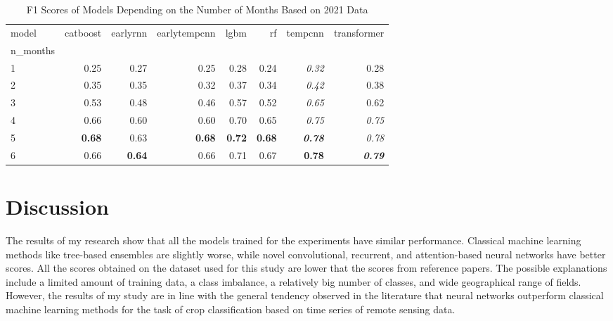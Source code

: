 \documentclass{article}
\begin{document}
\begin{table}
\centering
\caption{F1 Scores of Models Depending on the Number of Months Based on 2021 Data}
\label{Table 4.4.1}
\begin{tabular}{lrrrrrrr}
\toprule
model &  catboost &  earlyrnn &  earlytempcnn &  lgbm &    rf &  tempcnn &  transformer \\
n\_months &           &           &               &       &       &          &              \\
\midrule
1        &      0.25 &      0.27 &          0.25 &  0.28 &  0.24 &     \textit{0.32} &         0.28 \\
2        &      0.35 &      0.35 &          0.32 &  0.37 &  0.34 &     \textit{0.42} &         0.38 \\
3        &      0.53 &      0.48 &          0.46 &  0.57 &  0.52 &     \textit{0.65} &         0.62 \\
4        &      0.66 &      0.60 &          0.60 &  0.70 &  0.65 &     \textit{0.75} &         \textit{0.75} \\
5        &      \textbf{0.68} &      0.63 &          \textbf{0.68} &  \textbf{0.72} &  \textbf{0.68} &     \textbf{\textit{0.78}} &         \textit{0.78} \\
6        &      0.66 &      \textbf{0.64} &          0.66 &  0.71 &  0.67 &    \textbf{ 0.78} &         \textbf{\textit{0.79}} \\
\bottomrule
\end{tabular}
\end{table}

\section{Discussion}

The results of my research show that all the models trained for the experiments have similar performance. Classical machine learning methods like tree-based ensembles are slightly worse, while novel convolutional, recurrent, and attention-based neural networks have better scores. All the scores obtained on the dataset used for this study are lower that the scores from reference papers. The possible explanations include a limited amount of training data, a class imbalance, a relatively big number of classes, and wide geographical range of fields. However, the results of my study are in line with the general tendency observed in the literature that neural networks outperform classical machine learning methods for the task of crop classification based on time series of remote sensing data.
\end{document}
